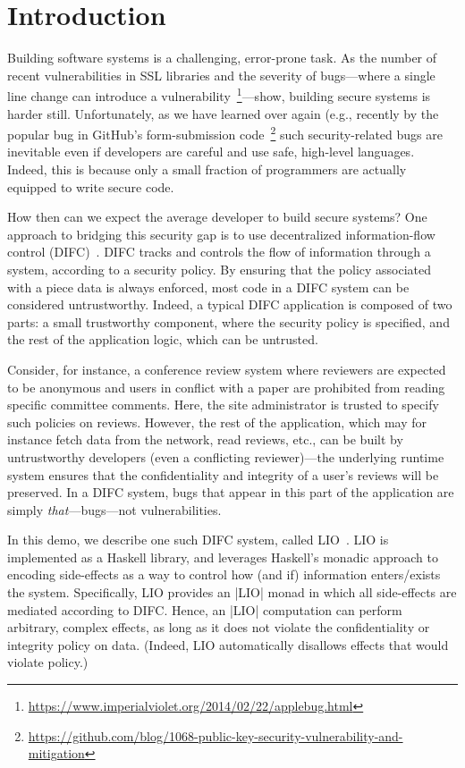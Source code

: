 \section{Introduction}
\label{sec:intro}

Building software systems is a challenging, error-prone task.
%
As the number of recent vulnerabilities in SSL libraries and the
severity of bugs---where a single line change can introduce a
vulnerability~\footnote{\url{https://www.imperialviolet.org/2014/02/22/applebug.html}}---show, building secure systems is harder
still.
%
Unfortunately, as we have learned over again (e.g., recently by the
popular bug in GitHub's form-submission code~\footnote{\url{https://github.com/blog/1068-public-key-security-vulnerability-and-mitigation}} such
security-related bugs are inevitable even if developers are careful
and use safe, high-level languages.
%
Indeed, this is because only a small fraction of programmers are
actually equipped to write secure code.
%


How then can we expect the average developer to build secure systems?
%
One approach to bridging this security gap is to use decentralized
information-flow control (DIFC)~\cite{myers:dlm,
sabelfeld:language-based-iflow}.
%
DIFC tracks and controls the flow of information through a system,
according to a security policy.
%
By ensuring that the policy associated with a piece data is always
enforced, most code in a DIFC system can be considered untrustworthy.
%
Indeed, a typical DIFC application is composed of two parts: a small
trustworthy component, where the security policy is specified, and the
rest of the application logic, which can be untrusted.
%

%
Consider, for instance, a conference review system where reviewers are
expected to be anonymous and users in conflict with a paper are
prohibited from reading specific committee comments.
%
Here, the site administrator is trusted to specify such policies on
reviews. 
%
However, the rest of the application, which may for instance fetch
data from the network, read reviews, etc., can be built by
untrustworthy developers (even a conflicting reviewer)---the
underlying runtime system ensures that the confidentiality and
integrity of a user's reviews will be preserved.
%
In a DIFC system, bugs that appear in this part of the application
are simply \emph{that}---bugs---not vulnerabilities.

In this demo, we describe one such DIFC system, called
LIO~\cite{lio, concurrent-lio}.
%
LIO is implemented as a Haskell library, and leverages Haskell's
monadic approach to encoding side-effects as a way to control how (and
if) information enters/exists the system.
%
Specifically, LIO provides an \hs|LIO| monad in which
all side-effects are mediated according to DIFC.
%
Hence, an \hs|LIO| computation can perform arbitrary, complex effects,
as long as it does not violate the confidentiality or integrity
policy on data.
%
(Indeed, LIO automatically disallows effects that would violate policy.)
